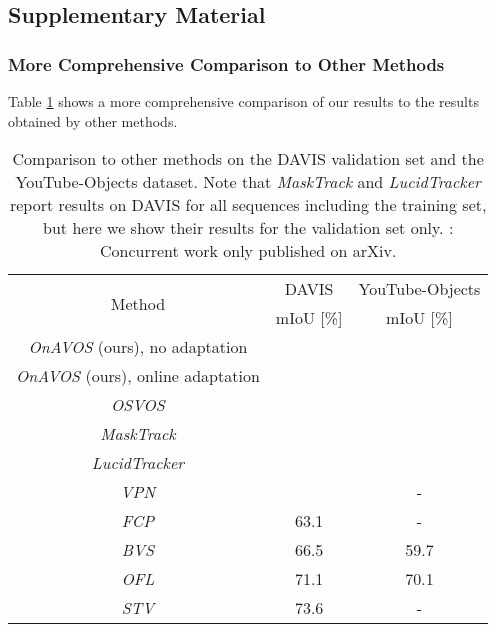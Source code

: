 \documentclass{bmvc2k}
\newcommand{\methodname}[1]{\mbox{\emph{#1}}}
\begin{document}



\clearpage
\appendix
\textcolor{bmv@sectioncolor}{\vspace{-1.2cm} \part*{Supplementary Material}}
\normalsize

\section{More Comprehensive Comparison to Other Methods}

Table \ref{tab:comparison} shows a more comprehensive comparison of our results to the results obtained by other methods.

\begin{table}[h]
\footnotesize
\begin{center}
\begin{tabular}{|c|c|c|}
\hline
\multirow{2}{*}{Method} & DAVIS & YouTube-Objects\tabularnewline
 & mIoU {[}\%{]} & mIoU {[}\%{]}\tabularnewline
\hline
\hline
\methodname{OnAVOS} (ours), no adaptation &  &  \tabularnewline \methodname{OnAVOS} (ours), online adaptation &  &  \tabularnewline \hline
\methodname{OSVOS} \cite{OSVOS} &  & \tabularnewline
\methodname{MaskTrack} \cite{masktrack} &  & \tabularnewline
\methodname{LucidTracker} \cite{lucidtracker}  &  & \tabularnewline
\methodname{VPN} \cite{videopropnetworks} &  & - \tabularnewline
\methodname{FCP} \cite{fcproposals} & 63.1 & - \tabularnewline
\methodname{BVS} \cite{bilateralvidseg} & 66.5 & 59.7 \tabularnewline
\methodname{OFL} \cite{Tsai16CVPR} & 71.1 & 70.1 \tabularnewline
\methodname{STV} \cite{Wang17arxiv} & 73.6 & - \tabularnewline

\hline
\end{tabular}
\end{center}
\caption{\label{tab:comparison}Comparison to other methods on the DAVIS validation set and the YouTube-Objects dataset. Note that \methodname{MaskTrack} \cite{masktrack} and \methodname{LucidTracker} \cite{lucidtracker} report results on DAVIS for all sequences including the training set, but here we show their results for the validation set only. : Concurrent work only published on arXiv.}
\end{table}
\end{document}
